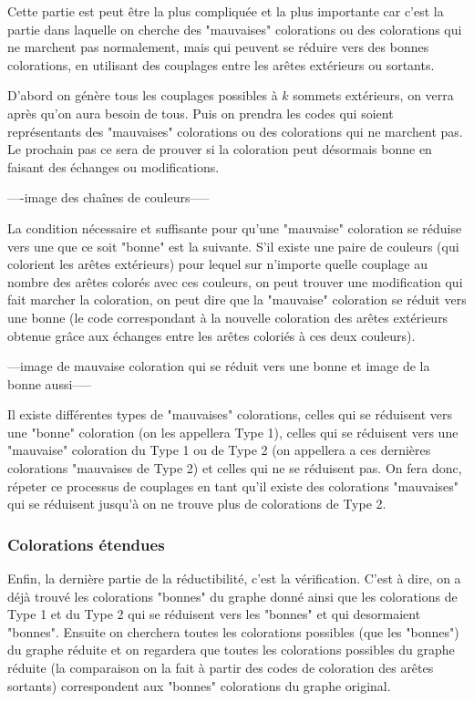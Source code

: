 \documentclass[10pt,a4paper]{article}
\begin{document}
Cette partie est peut être la plus compliquée et la plus importante car c'est la partie dans laquelle on cherche des "mauvaises" colorations ou des colorations qui ne marchent pas normalement, mais qui peuvent se réduire vers des bonnes colorations, en utilisant des couplages entre les arêtes extérieurs ou sortants. 

D'abord on génère tous les couplages possibles à $k$ sommets extérieurs, on verra après qu'on aura besoin de tous. Puis on prendra les codes qui soient représentants des "mauvaises" colorations ou des colorations qui ne marchent pas. Le prochain pas ce sera de prouver si la coloration peut désormais bonne en faisant des échanges ou modifications. 

----image des chaînes de couleurs-----

La condition nécessaire et suffisante pour qu'une "mauvaise" coloration se réduise vers une que ce soit "bonne" est la suivante. S'il existe une paire de couleurs (qui colorient les arêtes extérieurs) pour lequel sur n'importe quelle couplage au nombre des arêtes colorés avec ces couleurs, on peut trouver une modification qui fait marcher la coloration, on peut dire que la "mauvaise" coloration se réduit vers une bonne (le code correspondant à la nouvelle coloration des arêtes extérieurs obtenue grâce aux échanges entre les arêtes coloriés à ces deux couleurs).

---image de mauvaise coloration qui se réduit vers une bonne et image de la bonne aussi-----

Il existe différentes types de "mauvaises" colorations, celles qui se réduisent vers une "bonne" coloration (on les appellera Type 1), celles qui se réduisent vers une "mauvaise" coloration du Type 1 ou de Type 2 (on appellera a ces dernières colorations "mauvaises de Type 2) et celles qui ne se réduisent pas. On fera donc, répeter ce processus de couplages en tant qu'il existe des colorations "mauvaises" qui se réduisent jusqu'à on ne trouve plus de colorations de Type 2.

\subsubsection{Colorations étendues}

Enfin, la dernière partie de la réductibilité, c'est la vérification. C'est à dire, on a déjà trouvé les colorations "bonnes" du graphe donné ainsi que les colorations de Type 1 et du Type 2 qui se réduisent vers les "bonnes" et qui desormaient "bonnes". Ensuite on cherchera toutes les colorations possibles (que les "bonnes") du graphe réduite et on regardera que toutes les colorations possibles du graphe réduite (la comparaison on la fait à partir des codes de coloration des arêtes sortants) correspondent aux "bonnes" colorations du graphe original. 
\end{document}
